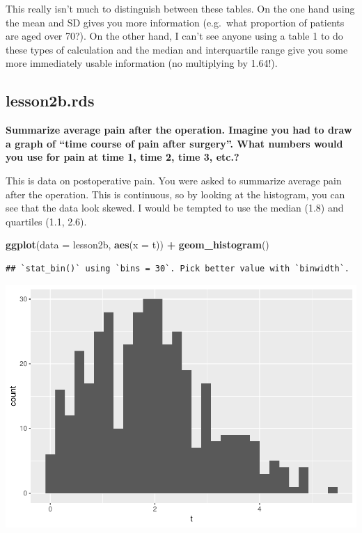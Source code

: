 \documentclass[]{book}
\newenvironment{Shaded}{\begin{snugshade}}{\end{snugshade}}
\newcommand{\DataTypeTok}[1]{\textcolor[rgb]{0.13,0.29,0.53}{#1}}
\newcommand{\KeywordTok}[1]{\textcolor[rgb]{0.13,0.29,0.53}{\textbf{#1}}}
\newcommand{\NormalTok}[1]{#1}
\newcommand{\OperatorTok}[1]{\textcolor[rgb]{0.81,0.36,0.00}{\textbf{#1}}}
\newcommand{\StringTok}[1]{\textcolor[rgb]{0.31,0.60,0.02}{#1}}
\begin{document}
This really isn't much to distinguish between these tables. On the one
hand using the mean and SD gives you more information (e.g.~what
proportion of patients are aged over 70?). On the other hand, I can't
see anyone using a table 1 to do these types of calculation and the
median and interquartile range give you some more immediately usable
information (no multiplying by 1.64!).

\hypertarget{lesson2b.rds}{%
\subsection{lesson2b.rds}\label{lesson2b.rds}}

\textbf{Summarize average pain after the operation. Imagine you had to
draw a graph of ``time course of pain after surgery''. What numbers
would you use for pain at time 1, time 2, time 3, etc.?}

This is data on postoperative pain. You were asked to summarize average
pain after the operation. This is continuous, so by looking at the
histogram, you can see that the data look skewed. I would be tempted to
use the median (1.8) and quartiles (1.1, 2.6).

\begin{Shaded}
\begin{Highlighting}[]
\KeywordTok{ggplot}\NormalTok{(}\DataTypeTok{data =}\NormalTok{ lesson2b,}
       \KeywordTok{aes}\NormalTok{(}\DataTypeTok{x =}\NormalTok{ t)) }\OperatorTok{+}
\StringTok{  }\KeywordTok{geom_histogram}\NormalTok{()}
\end{Highlighting}
\end{Shaded}

\begin{verbatim}
## `stat_bin()` using `bins = 30`. Pick better value with `binwidth`.
\end{verbatim}

\includegraphics{09-answers_files/figure-latex/week2d-1.pdf}
\end{document}
